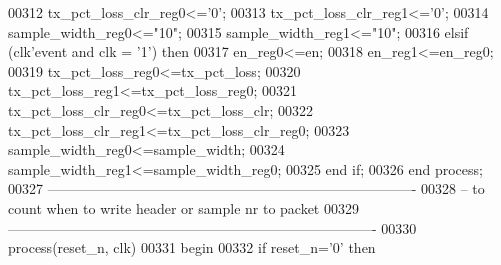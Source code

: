\begin{DoxyCode}
00312             \textcolor{vhdlchar}{tx_pct_loss_clr_reg0}\textcolor{vhdlchar}{<=}\textcolor{vhdlchar}{'}\textcolor{vhdllogic}{}\textcolor{vhdllogic}{0}\textcolor{vhdlchar}{'};
00313             \textcolor{vhdlchar}{tx_pct_loss_clr_reg1}\textcolor{vhdlchar}{<=}\textcolor{vhdlchar}{'}\textcolor{vhdllogic}{}\textcolor{vhdllogic}{0}\textcolor{vhdlchar}{'};
00314             \textcolor{vhdlchar}{sample_width_reg0}\textcolor{vhdlchar}{<=}\textcolor{vhdllogic}{"10"};
00315             \textcolor{vhdlchar}{sample_width_reg1}\textcolor{vhdlchar}{<=}\textcolor{vhdllogic}{"10"};
00316         \textcolor{keywordflow}{elsif} \textcolor{vhdlchar}{(}\textcolor{vhdlchar}{clk}\textcolor{vhdlchar}{'}\textcolor{vhdlkeyword}{event} \textcolor{keywordflow}{and} \textcolor{vhdlchar}{clk} \textcolor{vhdlchar}{=} \textcolor{vhdlchar}{'}\textcolor{vhdllogic}{}\textcolor{vhdllogic}{1}\textcolor{vhdlchar}{'}\textcolor{vhdlchar}{)} \textcolor{keywordflow}{then}
00317           \textcolor{vhdlchar}{en_reg0}\textcolor{vhdlchar}{<=}\textcolor{vhdlchar}{en};
00318           \textcolor{vhdlchar}{en_reg1}\textcolor{vhdlchar}{<=}\textcolor{vhdlchar}{en_reg0};
00319           \textcolor{vhdlchar}{tx_pct_loss_reg0}\textcolor{vhdlchar}{<=}\textcolor{vhdlchar}{tx_pct_loss};
00320           \textcolor{vhdlchar}{tx_pct_loss_reg1}\textcolor{vhdlchar}{<=}\textcolor{vhdlchar}{tx_pct_loss_reg0};
00321           \textcolor{vhdlchar}{tx_pct_loss_clr_reg0}\textcolor{vhdlchar}{<=}\textcolor{vhdlchar}{tx_pct_loss_clr};
00322           \textcolor{vhdlchar}{tx_pct_loss_clr_reg1}\textcolor{vhdlchar}{<=}\textcolor{vhdlchar}{tx_pct_loss_clr_reg0};
00323             \textcolor{vhdlchar}{sample_width_reg0}\textcolor{vhdlchar}{<=}\textcolor{vhdlchar}{sample_width};
00324             \textcolor{vhdlchar}{sample_width_reg1}\textcolor{vhdlchar}{<=}\textcolor{vhdlchar}{sample_width_reg0};
00325         \textcolor{keywordflow}{end} \textcolor{keywordflow}{if};
00326     \textcolor{keywordflow}{end} \textcolor{keywordflow}{process};
00327 \textcolor{keyword}{-------------------------------------------------------------------------------}
00328 \textcolor{keyword}{-- to count when to write header or sample nr to packet}
00329 \textcolor{keyword}{-------------------------------------------------------------------------------   }
00330       \textcolor{keywordflow}{process}(reset_n, clk)
00331 \textcolor{vhdlkeyword}{    begin}
00332       \textcolor{keywordflow}{if} \textcolor{vhdlchar}{reset_n}\textcolor{vhdlchar}{=}\textcolor{vhdlchar}{'}\textcolor{vhdllogic}{}\textcolor{vhdllogic}{0}\textcolor{vhdlchar}{'} \textcolor{keywordflow}{then}

\end{DoxyCode}

